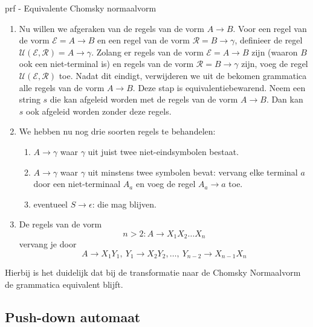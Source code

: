 \begin{prf}{prf - Equivalente Chomsky normaalvorm}
\begin{enumerate}
        \item
            Nu willen we afgeraken van de regels van de vorm $A \to B$. Voor een regel van de vorm $\mathcal{E} = A \to B$ en een regel van de vorm
            $\mathcal{R} = B \to \gamma$, definieer de regel $\mathcal{U}(\mathcal{E},\mathcal{R}) = A \to \gamma$. Zolang er regels van de vorm $\mathcal{E} = A \to B$ zijn (waaron $B$ ook een niet-terminal is)
            en regels van de vorm $\mathcal{R} = B \to \gamma$ zijn, voeg de regel $\mathcal{U}(\mathcal{E},\mathcal{R})$ toe. Nadat dit eindigt, verwijderen we uit de bekomen grammatica alle regels van de vorm $A \to B$.
            Deze stap is equivalentiebewarend. Neem een string $s$ die kan afgeleid worden met de regels van de vorm $A \to B$. Dan kan $s$ ook afgeleid worden zonder deze regels.
        \item 
            We hebben nu nog drie soorten regels te behandelen:
            \begin{enumerate}
                \item $A \to \gamma$ waar $\gamma$ uit juist twee niet-eindsymbolen bestaat.
                \item $A \to \gamma$ waar $\gamma$ uit minstens twee symbolen bevat: vervang elke terminal $a$ door een niet-terminaal $A_a$ en voeg de regel $A_a \to a$ toe.
                \item eventueel $S \to \epsilon$: die mag blijven.
            \end{enumerate}
        \item 
            De regels van de vorm 
            \begin{equation*}
                n > 2: A \to X_1X_2 \ldots X_n
            \end{equation*} 
            vervang je door
            \begin{equation*}
                A \to X_1Y_1, \ Y_1 \to X_2Y_2, \ldots, \ Y_{n-2} \to X_{n-1}X_n
            \end{equation*}
    \end{enumerate}
    Hierbij is het duidelijk dat bij de transformatie naar de Chomsky Normaalvorm de grammatica equivalent blijft.
\end{prf}

\subsection{Push-down automaat}

\vspace{0.5cm}

